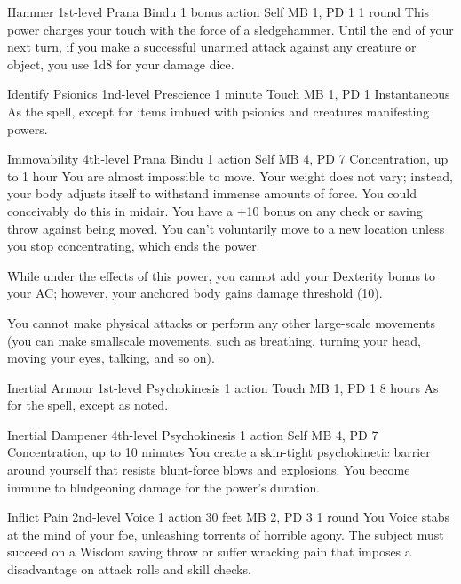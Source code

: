 \DndPowerHeader%
  {Hammer}
  {1st-level Prana Bindu}
  {1 bonus action}
  {Self}
  {MB 1, PD 1}
  {1 round}
This power charges your touch with the force of a sledgehammer.
Until the end of your next turn,
if you make a successful unarmed attack against any creature or object,
you use 1d8 for your damage dice.

\DndPowerHeader%
  {Identify Psionics}
  {1nd-level Prescience}
  {1 minute}
  {Touch}
  {MB 1, PD 1}
  {Instantaneous}
As the  spell,
except for items imbued with psionics
and creatures manifesting powers.

\DndPowerHeader%
  {Immovability}
  {4th-level Prana Bindu}
  {1 action}
  {Self}
  {MB 4, PD 7}
  {Concentration, up to 1 hour}
  You are almost impossible to move.
  Your weight does not vary;
  instead, your body adjusts itself to withstand
  immense amounts of force.
  You could conceivably do this in midair.
  You have a +10 bonus on any check or saving throw
  against being moved.
  You can't voluntarily move to a new location
  unless you stop concentrating, which ends the power.

  While under the effects of this power,
  you cannot add your Dexterity bonus to your AC;
  however, your anchored body gains damage threshold (10).
  
  You cannot make physical attacks
  or perform any other large-scale movements
  (you can make smallscale movements,
  such as breathing,
  turning your head,
  moving your eyes,
  talking, and so on).

\DndPowerHeader%
  {Inertial Armour}
  {1st-level Psychokinesis}
  {1 action}
  {Touch}
  {MB 1, PD 1}
  {8 hours}
As for the  spell, except as noted.

\DndPowerHeader%
  {Inertial Dampener}
  {4th-level Psychokinesis}
  {1 action}
  {Self}
  {MB 4, PD 7}
  {Concentration, up to 10 minutes}
  You create a skin-tight psychokinetic barrier around yourself
  that resists blunt-force blows and explosions.
  You become immune to bludgeoning damage for the power's duration.

\DndPowerHeader%
  {Inflict Pain}
  {2nd-level Voice}
  {1 action}
  {30 feet}
  {MB 2, PD 3}
  {1 round}
  You Voice stabs at the mind of your foe,
  unleashing torrents of horrible agony.
  The subject must succeed on a Wisdom saving throw or
  suffer wracking pain that imposes a disadvantage on attack rolls
  and skill checks.

